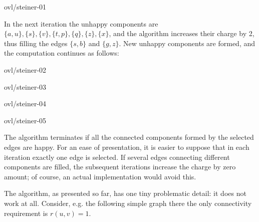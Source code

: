 \begin{myfig}{\textwidth}{ovl/steiner-01}
\end{myfig}


\noindent
In the next iteration the unhappy components are $\{a,u\},\{s\},\{v\},\{t,p\},\{q\},\{z\},\{x\}$,
and the algorithm increases their charge by 2, thus filling the edges $\{s,b\}$ and $\{g,z\}$.
New unhappy components are formed, and the computation continues as follows:


\begin{minipage}[t]{0.5\textwidth}
\vskip 0pt
\begin{myfig}{\textwidth}{ovl/steiner-02}
\end{myfig}
\end{minipage}
\begin{minipage}[t]{0.5\textwidth}
\vskip 0pt
\begin{myfig}{\textwidth}{ovl/steiner-03}
\end{myfig}
\end{minipage}




\begin{minipage}[t]{0.5\textwidth}
\vskip 0pt
\begin{myfig}{\textwidth}{ovl/steiner-04}
\end{myfig}
\end{minipage}
\begin{minipage}[t]{0.5\textwidth}
\vskip 0pt
\begin{myfig}{\textwidth}{ovl/steiner-05}
\end{myfig}
\end{minipage}

\noindent
The algorithm terminates if all the connected components formed by the selected edges are happy. 
For an ease of presentation, it is easier to suppose that in each iteration exactly one 
edge is selected. If several edges connecting different components are filled, the subsequent iterations
increase the charge by zero amount; of course, an actual implementation would avoid this.

\noindent
The algorithm, as presented so far, has one tiny problematic detail: it does not work at all. 
Consider, e.g. the following simple graph there the only connectivity requirement is  $r(u,v)=1$.


